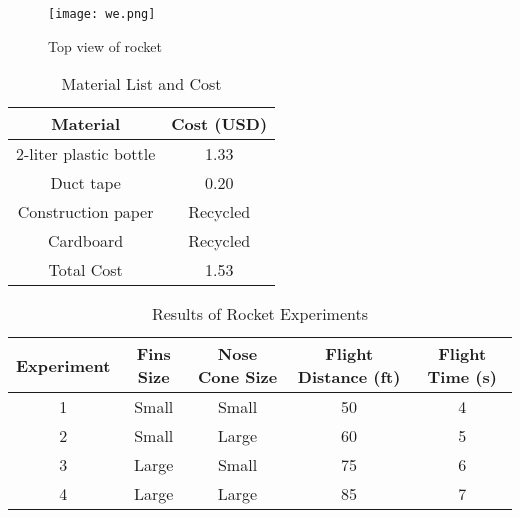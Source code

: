 \documentclass[11pt]{article}
\begin{document}
\begin{figure}[H]
\centering
\texttt{[image: we.png]}
\caption{Top view of rocket}
\label{fig:Computer-aided design}
\end{figure}

\begin{table}[h]
\centering
\renewcommand{\arraystretch}{2}
\caption{Material List and Cost}
\label{tab:material-list}
\begin{tabular}{|c|c|}
\hline
\textbf{Material} & \textbf{Cost (USD)} \\
\hline
2-liter plastic bottle & 1.33 \\
\hline
Duct tape & 0.20 \\
\hline
Construction paper & Recycled \\
\hline
Cardboard & Recycled \\
\hline
Total Cost & 1.53 \\
\hline
\end{tabular}
\end{table}

\begin{table}[h]
\centering
\renewcommand{\arraystretch}{2}
\caption{Results of Rocket Experiments}
\label{tab:rocket-experiments}
\begin{tabular}{|c|c|c|c|c|}
\hline
\textbf{Experiment} & \textbf{Fins Size} & \textbf{Nose Cone Size} & \textbf{Flight Distance (ft)} & \textbf{Flight Time (s)} \\
\hline
1 & Small & Small & 50 & 4 \\
\hline
2 & Small & Large & 60 & 5 \\
\hline
3 & Large & Small & 75 & 6 \\
\hline
4 & Large & Large & 85 & 7 \\
\hline
\end{tabular}
\end{table}
\end{document}
